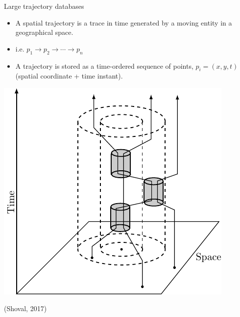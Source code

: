 \begin{frame}{Large trajectory databases}
    \begin{minipage}{0.59\textwidth}
        \begin{itemize}
            \item A spatial trajectory is a trace in time generated by a moving entity in a geographical space.
            \item i.e. $p_1 \rightarrow p_2 \rightarrow \cdots \rightarrow p_n$
            \item A trajectory is stored as a time-ordered sequence of points, $p_i = (x, y, t)$ (spatial coordinate + time instant).
        \end{itemize}
    \end{minipage}\hfill %
    \begin{minipage}{0.4\textwidth}
        \includegraphics[width=\textwidth]{figures/trajectory}
        \begin{flushright}
            {\tiny (Shoval, 2017)}
        \end{flushright}
    \end{minipage}
\end{frame}

